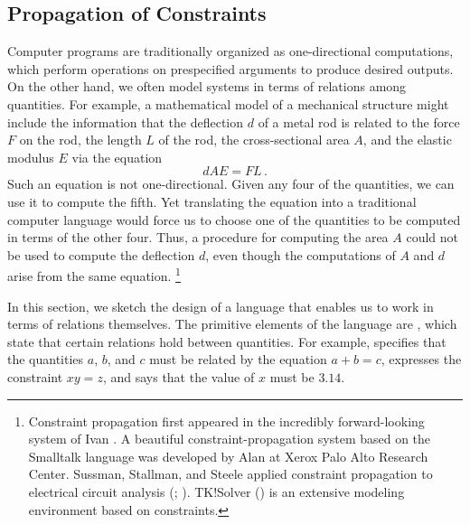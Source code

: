 \subsection{Propagation of Constraints}
\label{Section 3.3.5}

Computer programs are traditionally organized as one-directional computations, which perform operations on prespecified arguments to produce desired outputs.
On the other hand, we often model systems in terms of relations among quantities.
For example, a mathematical model of a mechanical structure might include the information that the deflection \( d \) of a metal rod is related to the force \( F \) on the rod, the length \( L \) of the rod, the cross-sectional area \( A \), and the elastic modulus \( E \) via the equation
\[
	dAE = FL \,.
\]
Such an equation is not one-directional.
Given any four of the quantities, we can use it to compute the fifth.
Yet translating the equation into a traditional computer language would force us to choose one of the quantities to be computed in terms of the other four.
Thus, a procedure for computing the area \( A \) could not be used to compute the deflection \( d \), even though the computations of \( A \) and \( d \) arise from the same equation.%
\footnote{
	Constraint propagation first appeared in the incredibly forward-looking  system of Ivan .
	A beautiful constraint-propagation system based on the Smalltalk language was developed by Alan  at Xerox Palo Alto Research Center.
	Sussman, Stallman, and Steele applied constraint propagation to electrical circuit analysis (; ).
	TK!Solver () is an extensive modeling environment based on constraints.
}

In this section, we sketch the design of a language that enables us to work in terms of relations themselves.
The primitive elements of the language are , which state that certain relations hold between quantities.
For example,  specifies that the quantities \( a \), \( b \), and \( c \) must be related by the equation \( a + b = c \),  expresses the constraint \( xy = z \), and  says that the value of \( x \) must be \( 3.14 \).

